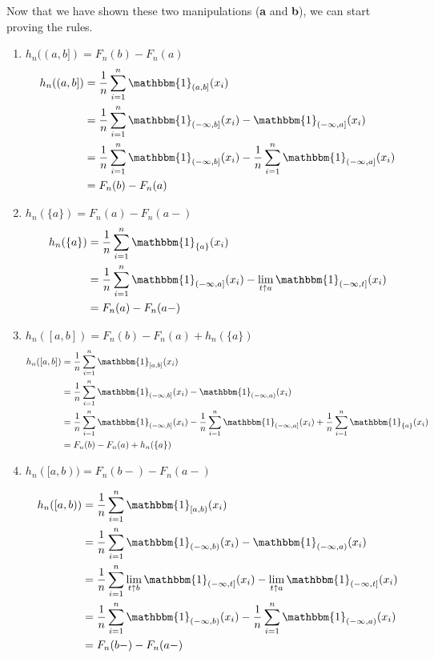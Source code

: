 \documentclass[12pt]{article}
\begin{document}
     Now that we have shown these two manipulations (\textbf{a} and \textbf{b}), we can start proving the rules.
    \begin{enumerate}[label= \textbf{\arabic*.   }]

    \item  $ h_n((a,b]) = F_n(b) - F_n(a) $
    \begin{align*}
        h_n((a,b]) &= \frac{1}{n}\sum_{i=1}^n \mathbbm{1}_{(a,b]}(x_i)\\
        &= \frac{1}{n}\sum_{i=1}^n \mathbbm{1}_{(-\infty,b]}(x_i)-\mathbbm{1}_{(-\infty,a]}(x_i)\\
        &= \frac{1}{n}\sum_{i=1}^n \mathbbm{1}_{(-\infty,b]}(x_i)-\frac{1}{n}\sum_{i=1}^n \mathbbm{1}_{(-\infty,a]}(x_i)\\
        &= F_n(b) - F_n(a)
        \end{align*}


        \item  $ h_n(\{a\}) = F_n(a)-F_n(a-) $
    \begin{align*}
        h_n(\{a\}) &= \frac{1}{n}\sum_{i=1}^n \mathbbm{1}_{\{a\}}(x_i)\\
        &= \frac{1}{n}\sum_{i=1}^n \mathbbm{1}_{(-\infty,a]}(x_i)-\lim_{t\uparrow a}\mathbbm{1}_{(-\infty,t]}(x_i)\\
        &= F_n(a)-F_n(a-)
        \end{align*}
    
        \item $ h_n([a,b]) = F_n(b)-F_n(a)+h_n(\{a\}) $
    \begin{align*}
        h_n([a,b]) &= \frac{1}{n}\sum_{i=1}^n \mathbbm{1}_{[a,b]}(x_i)\\
        &= \frac{1}{n}\sum_{i=1}^n \mathbbm{1}_{(-\infty,b]}(x_i)-\mathbbm{1}_{(-\infty,a)}(x_i)\\
        &= \frac{1}{n}\sum_{i=1}^n \mathbbm{1}_{(-\infty,b]}(x_i)-\frac{1}{n}\sum_{i=1}^n \mathbbm{1}_{(-\infty,a]}(x_i)+\frac{1}{n}\sum_{i=1}^n \mathbbm{1}_{\{a\}}(x_i)\\
        &= F_n(b)-F_n(a)+h_n(\{a\})
        \end{align*}
    
        \item $ h_n([a,b)) = F_n(b-)-F_n(a-) $

    \begin{align*}
        h_n([a,b)) &= \frac{1}{n}\sum_{i=1}^n \mathbbm{1}_{[a,b)}(x_i)\\
        &= \frac{1}{n}\sum_{i=1}^n \mathbbm{1}_{(-\infty,b)}(x_i)-\mathbbm{1}_{(-\infty,a)}(x_i)\\
        &= \frac{1}{n} \sum_{i=1}^n \lim_{t\uparrow b}\mathbbm{1}_{(-\infty,t]}(x_i)- \lim_{t\uparrow a}\mathbbm{1}_{(-\infty,t]}(x_i)\\
        &= \frac{1}{n} \sum_{i=1}^n \mathbbm{1}_{(-\infty,b)}(x_i)- \frac{1}{n} \sum_{i=1}^n \mathbbm{1}_{(-\infty,a)}(x_i)\\
        &= F_n(b-)-F_n(a-)
        \end{align*}


\end{enumerate}
\end{document}
